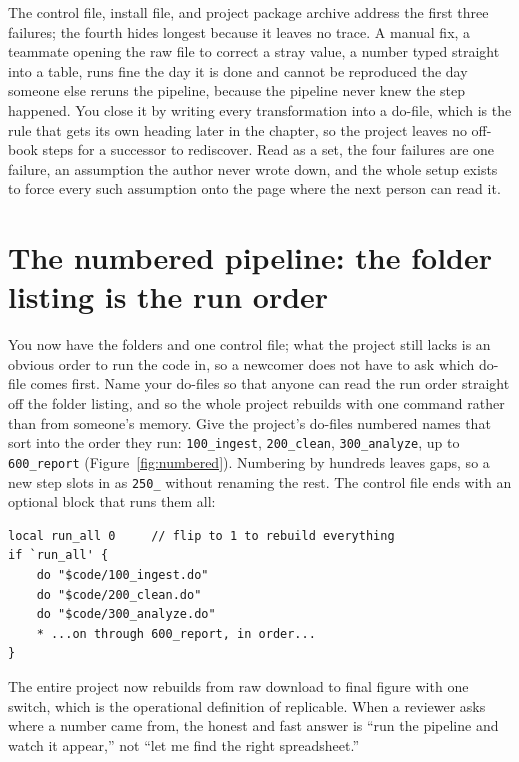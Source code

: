\documentclass[
    a4paper,
    fontsize=10pt,
    twoside=true,
    numbers=noenddot,
]{kaobook}
\begin{document}
The control file, install file, and project package archive address the first three failures; the fourth hides longest because it leaves no trace. A manual fix, a teammate opening the raw file to correct a stray value, a number typed straight into a table, runs fine the day it is done and cannot be reproduced the day someone else reruns the pipeline, because the pipeline never knew the step happened. You close it by writing every transformation into a do-file, which is the rule that gets its own heading later in the chapter, so the project leaves no off-book steps for a successor to rediscover. Read as a set, the four failures are one failure, an assumption the author never wrote down, and the whole setup exists to force every such assumption onto the page where the next person can read it.

\section{The numbered pipeline: the folder listing is the run order}\label{sec:numbered}
You now have the folders and one control file; what the project still lacks is an obvious order to run the code in, so a newcomer does not have to ask which do-file comes first. Name your do-files so that anyone can read the run order straight off the folder listing, and so the whole project rebuilds with one command rather than from someone's memory. Give the project's do-files numbered names that sort into the order they run: \texttt{100\_ingest}, \texttt{200\_clean}, \texttt{300\_analyze}, up to \texttt{600\_report} (Figure~\ref{fig:numbered}). Numbering by hundreds leaves gaps, so a new step slots in as \texttt{250\_} without renaming the rest. The control file ends with an optional block that runs them all:
\par
{\footnotesize
\begin{verbatim}
local run_all 0     // flip to 1 to rebuild everything
if `run_all' {
    do "$code/100_ingest.do"
    do "$code/200_clean.do"
    do "$code/300_analyze.do"
    * ...on through 600_report, in order...
}
\end{verbatim}
}
The entire project now rebuilds from raw download to final figure with one switch, which is the operational definition of replicable. When a reviewer asks where a number came from, the honest and fast answer is \enquote{run the pipeline and watch it appear,} not \enquote{let me find the right spreadsheet.}
\end{document}
